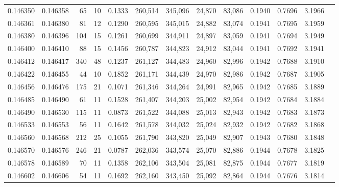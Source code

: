 \begin{tabular}{rrrrrrrrrrrrr}
0.146350 & 0.146358 &    65 &  10 &                                     0.1333 & 260,514 & 345,096 &  24,870 &  83,086 & 0.1940 & 0.7696 & 3.1966 \\
0.146361 & 0.146380 &    81 &  12 &                                     0.1290 & 260,595 & 345,015 &  24,882 &  83,074 & 0.1941 & 0.7695 & 3.1959 \\
0.146380 & 0.146396 &   104 &  15 &                                     0.1261 & 260,699 & 344,911 &  24,897 &  83,059 & 0.1941 & 0.7694 & 3.1949 \\
0.146400 & 0.146410 &    88 &  15 &                                     0.1456 & 260,787 & 344,823 &  24,912 &  83,044 & 0.1941 & 0.7692 & 3.1941 \\
0.146412 & 0.146417 &   340 &  48 &                                     0.1237 & 261,127 & 344,483 &  24,960 &  82,996 & 0.1942 & 0.7688 & 3.1910 \\
0.146422 & 0.146455 &    44 &  10 &                                     0.1852 & 261,171 & 344,439 &  24,970 &  82,986 & 0.1942 & 0.7687 & 3.1905 \\
0.146456 & 0.146476 &   175 &  21 &                                     0.1071 & 261,346 & 344,264 &  24,991 &  82,965 & 0.1942 & 0.7685 & 3.1889 \\
0.146485 & 0.146490 &    61 &  11 &                                     0.1528 & 261,407 & 344,203 &  25,002 &  82,954 & 0.1942 & 0.7684 & 3.1884 \\
0.146490 & 0.146530 &   115 &  11 &                                     0.0873 & 261,522 & 344,088 &  25,013 &  82,943 & 0.1942 & 0.7683 & 3.1873 \\
0.146533 & 0.146553 &    56 &  11 &                                     0.1642 & 261,578 & 344,032 &  25,024 &  82,932 & 0.1942 & 0.7682 & 3.1868 \\
0.146560 & 0.146568 &   212 &  25 &                                     0.1055 & 261,790 & 343,820 &  25,049 &  82,907 & 0.1943 & 0.7680 & 3.1848 \\
0.146570 & 0.146576 &   246 &  21 &                                     0.0787 & 262,036 & 343,574 &  25,070 &  82,886 & 0.1944 & 0.7678 & 3.1825 \\
0.146578 & 0.146589 &    70 &  11 &                                     0.1358 & 262,106 & 343,504 &  25,081 &  82,875 & 0.1944 & 0.7677 & 3.1819 \\
0.146602 & 0.146606 &    54 &  11 &                                     0.1692 & 262,160 & 343,450 &  25,092 &  82,864 & 0.1944 & 0.7676 & 3.1814 \\

\end{tabular}
